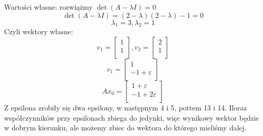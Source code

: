 \documentclass{article}
\begin{document}
Wartości własne: rozwiążmy $ \det(A-\lambda I) =0$
$$\det(A-\lambda I) = (2-\lambda)(2-\lambda)-1=0$$
$$\lambda_1=3, \lambda_2=1$$
Czyli wektory własne:
$$v_1=\begin{bmatrix}
1\\
1\\
\end{bmatrix}, v_2=\begin{bmatrix}
2\\
1\\
\end{bmatrix}$$
$$v_1=\begin{bmatrix}
1\\
-1+\varepsilon\\
\end{bmatrix}$$
$$Ax_0=\begin{bmatrix}
1+\varepsilon\\
-1+2\varepsilon\\
\end{bmatrix}$$ Z epsilona zrobiły się dwa epsilony, w następnym 4 i 5, pottem 13 i 14. Iloraz współczynników przy epsilonach zbiega do jedynki, więc wynikowy wektor będzie w dobrym kierunku, ale możemy zbiec do wektora do którego mieliśmy dalej.
\end{document}
